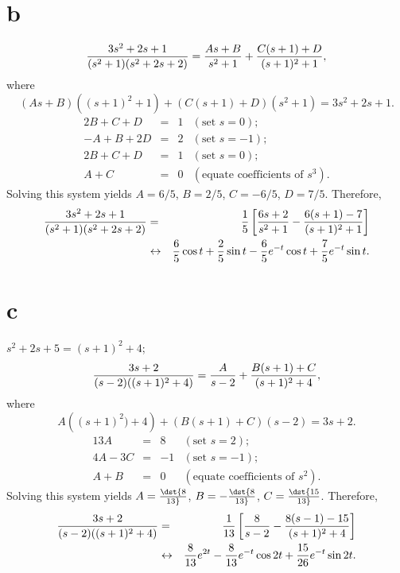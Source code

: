 \documentclass[dvips]{book}
\numberwithin{example}{section}
\numberwithin{equation}{section}
\numberwithin{theorem}{section}
\numberwithin{table}{section}
\numberwithin{figure}{section}
\begin{document}
\part{b}
$$
{3s^2+2s+1\over(s^2+1)(s^2+2s+2)}=
{As+B\over s^2+1}+{C(s+1)+D\over(s+1)^2+1},
$$
where
$$
(As+B)((s+1)^2+1)+(C(s+1)+D)(s^2+1)=3s^2+2s+1.
$$
$$
\begin{array}{rcrl}
2B+C+D&=&1&(\mbox{set }s=0);\\
-A+B+2D&=&2& (\mbox{set }s=-1);\\
2B+C+D&=&1&(\mbox{set }s=0);\\
A+C&=&0&(\mbox{equate coefficients of }s^3).
\end{array}
$$
Solving this system yields
$A=6/5$, $B=2/5$, $C=-6/5$, $D=7/5$.
Therefore,
\begin{eqnarray*}
{3s^2+2s+1\over(s^2+1)(s^2+2s+2)}&=&
{1\over5}\left[{6s+2\over s^2+1}-{6(s+1)-7\over(s+1)^2+1}\right]\\
&\leftrightarrow&
 {6\over5}\cos t+{2\over5}\sin t
-{6\over5}e^{-t}\cos t+{7\over5}e^{-t}\sin t.
\end{eqnarray*}

\part{c}
$s^2+2s+5=(s+1)^2+4$;
$$
{3s+2\over(s-2)((s+1)^2+4)}={A\over s-2}+
{B(s+1)+C\over(s+1)^2+4},
$$
where
$$
A\left((s+1)^2)+4\right)+
\left(B(s+1)+C\right)(s-2)=3s+2.
$$
$$
\begin{array}{rcrl}
13A&=&8&(\mbox{set }s=2);\\
4A-3C&=&-1&(\mbox{set }s=-1);\\
A+B&=&0&(\mbox{equate coefficients of }s^2).
\end{array}
$$
Solving this system yields $A=\dst{8\over13}$, $B=-\dst{8\over13}$,
$C=\dst{15\over13}$. Therefore,
\begin{eqnarray*}
{3s+2\over(s-2)((s+1)^2+4)}&=&{1\over13}\left[{8\over
s-2}-
{8(s-1)-15\over(s+1)^2+4}\right]\\
&\leftrightarrow&
{8\over13}e^{2t}-{8\over13}e^{-t}\cos 2t+{15\over26}
e^{-t}\sin 2t.
\end{eqnarray*}
\end{document}
